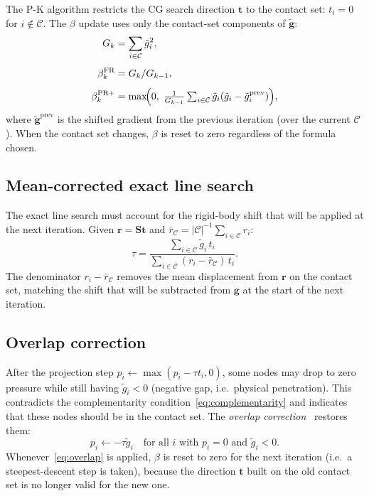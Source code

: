 \documentclass[11pt,a4paper]{article}
\newcommand{\bS}{\mathbf{S}}
\newcommand{\bg}{\mathbf{g}}
\newcommand{\br}{\mathbf{r}}
\newcommand{\bt}{\mathbf{t}}
\newcommand{\calC}{\mathcal{C}}
\begin{document}
The P-K algorithm restricts the CG search direction $\bt$ to the contact set:
$t_i = 0$ for $i \notin \calC$.  The $\beta$ update uses only the contact-set
components of $\tilde{\bg}$:
\begin{align}
  G_k &= \sum_{i \in \calC} \tilde g_i^2, \label{eq:Gk}\\[4pt]
  \beta_k^{\mathrm{FR}}  &= G_k / G_{k-1}, \label{eq:beta-fr-pk}\\[4pt]
  \beta_k^{\mathrm{PR+}} &= \max\!\Bigl(0,\;
     \tfrac{1}{G_{k-1}}\textstyle\sum_{i\in\calC}\tilde g_i(\tilde g_i - \tilde g_i^{\mathrm{prev}})\Bigr),
  \label{eq:beta-pr-pk}
\end{align}
where $\tilde{\bg}^{\mathrm{prev}}$ is the shifted gradient from the previous
iteration (over the current $\calC$).  When the contact set changes,
$\beta$ is reset to zero regardless of the formula chosen.

\subsection{Mean-corrected exact line search}

The exact line search must account for the rigid-body shift that will be applied
at the next iteration.  Given $\br = \bS\bt$ and $\bar r_\calC = |\calC|^{-1}\sum_{i\in\calC}r_i$:
\begin{equation}
  \tau = \frac{\sum_{i\in\calC}\tilde g_i\, t_i}
              {\sum_{i\in\calC}(r_i - \bar r_\calC)\, t_i}.
  \label{eq:tau}
\end{equation}
The denominator $r_i - \bar r_\calC$ removes the mean displacement from $\br$
on the contact set, matching the shift that will be subtracted from $\bg$ at the
start of the next iteration.

\subsection{Overlap correction}

After the projection step $p_i \leftarrow \max(p_i - \tau t_i, 0)$,
some nodes may drop to zero pressure while still having $\tilde g_i < 0$
(negative gap, i.e.\ physical penetration).
This contradicts the complementarity condition~\eqref{eq:complementarity}
and indicates that these nodes should be in the contact set.
The \emph{overlap correction}~\cite{PolKeer1999} restores them:
\begin{equation}
  p_i \leftarrow -\tau\tilde g_i \quad
  \text{for all } i \text{ with } p_i = 0 \text{ and } \tilde g_i < 0.
  \label{eq:overlap}
\end{equation}
Whenever~\eqref{eq:overlap} is applied, $\beta$ is reset to zero for the next
iteration (i.e.\ a steepest-descent step is taken), because the direction $\bt$
built on the old contact set is no longer valid for the new one.
\end{document}
